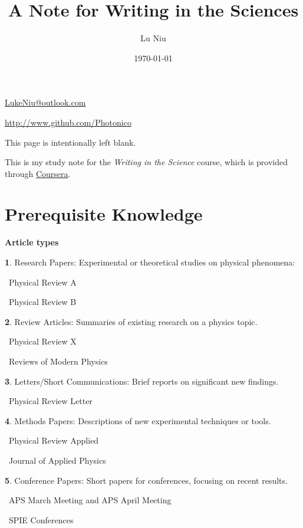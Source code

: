 \documentclass[a4paper, 12pt]{article}
\title{\textbf{A Note for Writing in the Sciences}}
\author{Lu Niu}
\date{\today}
\begin{document}
\maketitle
\vspace{\fill}
\begin{center}
    \par\href{mailto:LukeNiu@outlook.com}{LukeNiu@outlook.com}
    \par\href{http://www.github.com/Photonico}{http://www.github.com/Photonico}
\end{center}
\thispagestyle{empty}

\newpage
This page is intentionally left blank.
\thispagestyle{empty}

\newpage
\thispagestyle{empty}
\tableofcontents
\thispagestyle{empty}

\newpage
{}

This is my study note for the \textit{Writing in the Science} course,
which is provided through \href{https://www.coursera.org/learn/sciwrite}{Coursera}.

\section*{Prerequisite Knowledge}

\textbf{Article types}

\textbf{1}. Research Papers: Experimental or theoretical studies on physical phenomena:
\par\quad\textopenbullet\ Physical Review A
\par\quad\textopenbullet\ Physical Review B

\textbf{2}. Review Articles: Summaries of existing research on a physics topic.
\par\quad\textopenbullet\ Physical Review X
\par\quad\textopenbullet\ Reviews of Modern Physics

\textbf{3}. Letters/Short Communications: Brief reports on significant new findings.
\par\quad\textopenbullet\ Physical Review Letter

\textbf{4}. Methods Papers: Descriptions of new experimental techniques or tools.
\par\quad\textopenbullet\ Physical Review Applied
\par\quad\textopenbullet\ Journal of Applied Physics

\textbf{5}. Conference Papers: Short papers for conferences, focusing on recent results.
\par\quad\textopenbullet\ APS March Meeting and APS April Meeting
\par\quad\textopenbullet\ SPIE Conferences
\end{document}

